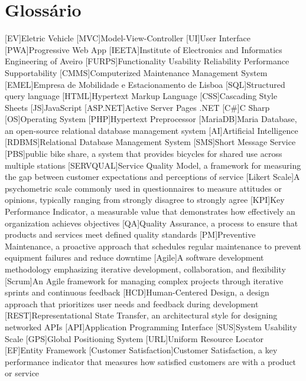 \chapter{Glossário}

\footnotesize
\SingleSpacing

\begin{multicols}{2}
\begin{acronym}[AAAAAA]

	[EV]{Eletric Vehicle}
	[MVC]{Model-View-Controller}
	[UI]{User Interface}
	[PWA]{Progressive Web App}
	[IEETA]{Institute of Electronics and Informatics Engineering of Aveiro}
	[FURPS]{Functionality Usability Reliability Performance Supportability}
	[CMMS]{Computerized Maintenance Management System}
	[EMEL]{Empresa de Mobilidade e Estacionamento de Lisboa}
	[SQL]{Structured query language}
	[HTML]{Hypertext Markup Language}
	[CSS]{Cascading Style Sheets}
	[JS]{JavaScript}
	[ASP.NET]{Active Server Pages .NET}
	[C\#]{C Sharp}
	[OS]{Operating System}
	[PHP]{Hypertext Preprocessor}
	[MariaDB]{Maria Database, an open-source relational database management system}
	[AI]{Artificial Intelligence}
	[RDBMS]{Relational Database Management System}
	[SMS]{Short Message Service}
	[PBS]{public bike share, a system that provides bicycles for shared use across multiple stations}
	[SERVQUAL]{Service Quality Model, a framework for measuring the gap between customer expectations and perceptions of service}
	[Likert Scale]{A psychometric scale commonly used in questionnaires to measure attitudes or opinions, typically ranging from strongly disagree to strongly agree}
	[KPI]{Key Performance Indicator, a measurable value that demonstrates how effectively an organization achieves objectives}
	[QA]{Quality Assurance, a process to ensure that products and services meet defined quality standards}
	[PM]{Preventive Maintenance, a proactive approach that schedules regular maintenance to prevent equipment failures and reduce downtime}
	[Agile]{A software development methodology emphasizing iterative development, collaboration, and flexibility}
	[Scrum]{An Agile framework for managing complex projects through iterative sprints and continuous feedback}
	[HCD]{Human-Centered Design, a design approach that prioritizes user needs and feedback during development}
	[REST]{Representational State Transfer, an architectural style for designing networked APIs}
	[API]{Application Programming Interface}
	[SUS]{System Usability Scale}
	[GPS]{Global Positioning System}
	[URL]{Uniform Resource Locator}
	[EF]{Entity Framework}
	[Customer Satisfaction]{Customer Satisfaction, a key performance indicator that measures how satisfied customers are with a product or service}


\end{acronym}
\end{multicols}
